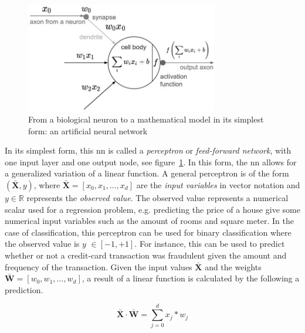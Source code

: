 \documentclass[draft,final]{vutinfth} %
\begin{document}
    \begin{figure}[h]
        \centering
        \includegraphics[width=0.75\textwidth]{figures/neuron_model.png}
        \caption[From a biological neuron to a mathematical model: an artificial neural network in its simplest form]{From a biological neuron to a mathematical model in its simplest form: an artificial neural network\protect\footnotemark}
        \label{fig:neuron_model}
    \end{figure}


    In its simplest form, this \gls{nn} is called a \textit{perceptron} or \textit{feed-forward network}, with one input layer and one output node, see figure~\ref{fig:neuron_model}.
    In this form, the \gls{nn} allows for a generalized variation of a linear function.
    A general perceptron is of the form $(\bar{\mathbf{X}},y)$, where $\bar{\mathbf{X}}=[x_0,x_1,\ldots,x_d]$ are the \textit{input variables} in vector notation and $y \in \mathbb{R}$  represents the \textit{observed value}.
    The observed value represents a numerical scalar used for a regression problem, e.g. predicting the price of a house give some numerical input variables such as the amount of rooms and square meter.
    In the case of classification, this perceptron can be used for binary classification where the observed value is $y$ $\in [-1,+1]$.
    For instance, this can be used to predict whether or not a credit-card transaction was fraudulent given the amount and frequency of the transaction.
    Given the input values $\bar{\mathbf{X}}$ and the weights $\bar{\mathbf{W}}=[w_0,w_1,\ldots,w_d]$, a result of a linear function is calculated by the following a prediction.

    \begin{equation}
        \bar{\mathbf{X}}\cdot\bar{\mathbf{W}}=\sum_{j=0}^{d}x_j*w_j\label{eq:feed_forward_equation}
    \end{equation}
\end{document}
